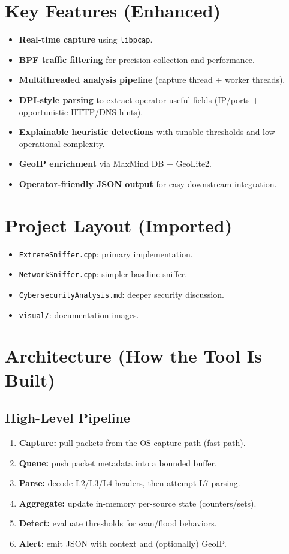 \documentclass[14pt]{extarticle}
\begin{document}
\section{Key Features (Enhanced)}
\begin{itemize}
  \item \textbf{Real-time capture} using \texttt{libpcap}.
  \item \textbf{BPF traffic filtering} for precision collection and performance.
  \item \textbf{Multithreaded analysis pipeline} (capture thread + worker threads).
  \item \textbf{DPI-style parsing} to extract operator-useful fields (IP/ports + opportunistic HTTP/DNS hints).
  \item \textbf{Explainable heuristic detections} with tunable thresholds and low operational complexity.
  \item \textbf{GeoIP enrichment} via MaxMind DB + GeoLite2.
  \item \textbf{Operator-friendly JSON output} for easy downstream integration.
\end{itemize}

\section{Project Layout (Imported)}
\begin{itemize}
  \item \texttt{ExtremeSniffer.cpp}: primary implementation.
  \item \texttt{NetworkSniffer.cpp}: simpler baseline sniffer.
  \item \texttt{CybersecurityAnalysis.md}: deeper security discussion.
  \item \texttt{visual/}: documentation images.
\end{itemize}

\section{Architecture (How the Tool Is Built)}
\subsection{High-Level Pipeline}
\begin{enumerate}
  \item \textbf{Capture:} pull packets from the OS capture path (fast path).
  \item \textbf{Queue:} push packet metadata into a bounded buffer.
  \item \textbf{Parse:} decode L2/L3/L4 headers, then attempt L7 parsing.
  \item \textbf{Aggregate:} update in-memory per-source state (counters/sets).
  \item \textbf{Detect:} evaluate thresholds for scan/flood behaviors.
  \item \textbf{Alert:} emit JSON with context and (optionally) GeoIP.
\end{enumerate}
\end{document}
